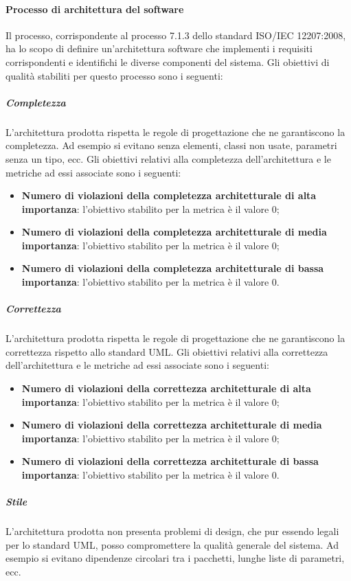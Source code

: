 			\paragraph{Processo di architettura del software}
			Il processo, corrispondente al processo 7.1.3 dello standard ISO/IEC 12207:2008, ha lo scopo di definire un'architettura software che implementi i requisiti corrispondenti e identifichi le diverse componenti del sistema.
			Gli obiettivi di qualità stabiliti per questo processo sono i seguenti:
				\subparagraph{Completezza}
				L'architettura prodotta rispetta le regole di progettazione che ne garantiscono la completezza. Ad esempio si evitano  senza elementi, classi non usate, parametri senza un tipo, ecc.
				Gli obiettivi relativi alla completezza dell'architettura e le metriche ad essi associate sono i seguenti:
		 		\begin{itemize}
					\item \textbf{Numero di violazioni della completezza architetturale di alta importanza}: l'obiettivo stabilito per la metrica è il valore 0;
					\item \textbf{Numero di violazioni della completezza architetturale di media importanza}: l'obiettivo stabilito per la metrica è il valore 0;
					\item \textbf{Numero di violazioni della completezza architetturale di bassa importanza}: l'obiettivo stabilito per la metrica è il valore 0.
				\end{itemize}
				\subparagraph{Correttezza}
				L'architettura prodotta rispetta le regole di progettazione che ne garantiscono la correttezza rispetto allo standard UML.
				Gli obiettivi relativi alla correttezza dell'architettura e le metriche ad essi associate sono i seguenti:
		 		\begin{itemize}
					\item \textbf{Numero di violazioni della correttezza architetturale di alta importanza}: l'obiettivo stabilito per la metrica è il valore 0;
					\item \textbf{Numero di violazioni della correttezza architetturale di media importanza}: l'obiettivo stabilito per la metrica è il valore 0;
					\item \textbf{Numero di violazioni della correttezza architetturale di bassa importanza}: l'obiettivo stabilito per la metrica è il valore 0.
				\end{itemize}
				\subparagraph{Stile}
				L'architettura prodotta non presenta problemi di design, che pur essendo legali per lo standard UML, posso compromettere la qualità generale del sistema. Ad esempio si evitano dipendenze circolari tra i pacchetti, lunghe liste di parametri, ecc.
